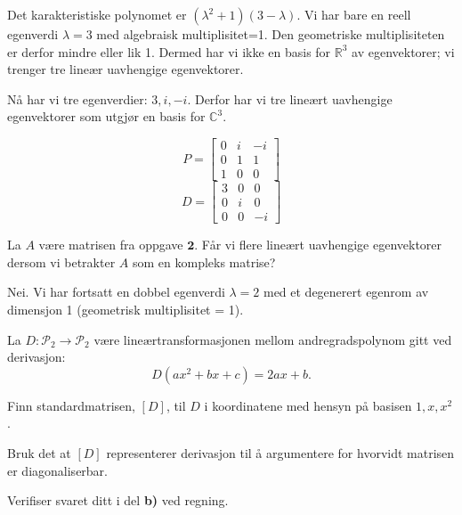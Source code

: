 \begin{losning}

\begin{punkt}
Det karakteristiske polynomet er $(\lambda^2+1)(3-\lambda)$. Vi har bare en reell egenverdi $\lambda=3$ med algebraisk multiplisitet=1. Den geometriske multiplisiteten er derfor mindre eller lik 1. Dermed har vi ikke en basis for $\mathbb{R}^3$ av egenvektorer; vi trenger tre lineær uavhengige egenvektorer. 
\end{punkt}

\begin{punkt}
Nå har vi tre egenverdier: $3,i,-i$. Derfor har vi tre lineært uavhengige egenvektorer som utgjør en basis for $\mathbb{C}^3$.
\end{punkt}

\begin{punkt}
$$P=\begin{bmatrix}
0 & i & -i\\
0 & 1 & 1\\
1 & 0 & 0
\end{bmatrix}$$
$$D=\begin{bmatrix}
3 & 0 & 0\\
0 & i & 0\\
0 & 0 & -i
\end{bmatrix}$$
\end{punkt}

\end{losning}

\begin{oppgave}
La $A$ være matrisen fra oppgave $\textbf{2.}$ Får vi flere lineært uavhengige egenvektorer dersom vi betrakter $A$ som en kompleks matrise?
\end{oppgave}

\begin{losning}
Nei. Vi har fortsatt en dobbel egenverdi $\lambda=2$ med et degenerert egenrom av dimensjon 1 (geometrisk multiplisitet = 1).
\end{losning}

\begin{oppgave}
La $D:\mathcal{P}_2\rightarrow \mathcal{P}_2$ være lineærtransformasjonen mellom andregradspolynom gitt ved derivasjon: $$D(ax^2+bx+c)=2ax+b.$$

\begin{punkt}
Finn standardmatrisen, $[D]$, til $D$ i koordinatene med hensyn på basisen $1,x,x^2$.
\end{punkt}

\begin{punkt}
Bruk det at $[D]$ representerer derivasjon til å argumentere for hvorvidt matrisen er diagonaliserbar.
\end{punkt}

\begin{punkt}
Verifiser svaret ditt i del \textbf{b)} ved regning. 
\end{punkt}


\end{oppgave}

